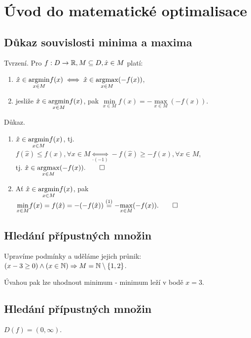 \section{Úvod do matematické optimalisace}

\subsection{Důkaz souvislosti minima a maxima}

Tvrzení. Pro $f: D \rightarrow \mathbb{R}, M \subseteq D, \hat{x} \in M$ platí:

\begin{enumerate}[(1)]
    \item $\hat{x} \in \underset{x \in M}{\operatorname*{argmin}} f(x) \iff \hat{x} \in \underset{x \in M}{\operatorname*{argmax}} (-f(x))$,
    \item jesliže $\hat{x} \in \underset{x \in M}{\operatorname*{argmin}} f(x)$, pak $\underset{x \in M}{\min} f(x) =
    - \underset{x \in M}{\max} (-f(x))$.
\end{enumerate}
Důkaz.

\begin{enumerate}[(1)]

\item $\hat{x} \in \underset{x \in M}{\operatorname*{argmin}} f(x)$, tj. $f(\hat{x}) \leq f(x), \forall x \in M \underset{\cdot (-1)}{\iff}
-f(\hat{x}) \geq -f(x), \forall x \in M$,\\tj. $\hat{x} \in \underset{x \in M}{\operatorname*{argmax}} (-f(x)). \qed$


\item Ať $\hat{x} \in \underset{x \in M}{\operatorname*{argmin}} f(x)$, pak $\underset{x \in M}{\min} f(x) = f(\hat{x}) =
- (- f(\hat{x})) \overset{(1)}{=} - \underset{x \in M}{\max} (-f(x)). \qed$
\end{enumerate}

\subsection{Hledání přípustných množin}
Upravíme podmínky a uděláme jejich průnik: $(x - 3 \geq 0) \land (x \in \mathbb{N}) \Rightarrow M = \mathbb{N} \setminus \left\lbrace 1,2 \right\rbrace$.

Úvahou pak lze uhodnout minimum - minimum leží v bodě $x=3$.

\subsection{Hledání přípustných množin}
$D(f) = (0, \infty)$.

